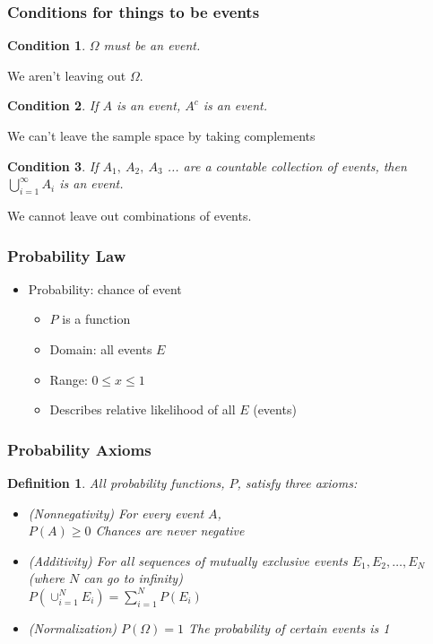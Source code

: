 \documentclass[handout]{beamer}
\newtheorem{condition}{Condition}
\newtheorem{defn}{Definition}
\numberwithin{equation}{section}
\begin{document}
\begin{frame}
\frametitle{Conditions for things to be events}


\begin{condition}
$\Omega$ must be an event. \\
\end{condition}

We aren't leaving out $\Omega$.

\begin{condition}
If $A$ is an event, $A^c$ is an event. \\
\end{condition}

We can't leave the sample space by taking complements

\begin{condition}
If $A_1,\ A_2,\ A_3$ ... are a countable collection of events, then $\bigcup_{i=1}^\infty A_i$ is an event. \\
\end{condition}

We cannot leave out combinations of events.

\end{frame}




\begin{frame}
\frametitle{Probability Law}

\begin{itemize}
\item \alert{Probability}: chance of event \pause 
\begin{itemize}
\item[-] $P$ is a function \pause 
\item[-] Domain: all events $E$ \pause 
\item[-] Range: $0\leq x\leq1$ \pause 
\item[-] Describes relative likelihood of all $E$
  (events)
\end{itemize}
\end{itemize}

\end{frame}

\begin{frame}
\frametitle{Probability Axioms} 


\begin{defn}
All probability functions, $P$, satisfy three axioms: \pause 
\begin{itemize}
\item[1)] (Nonnegativity) For every event $A$, \\ \pause 
$P(A) \geq 0$  \pause 
Chances are never negative \pause 
\item[2)] (Additivity) For all sequences of mutually exclusive events $E_{1},
  E_{2}, \hdots,E_{N} $ (where $N$ can go to infinity)\\\pause 
$P\left(\cup_{i=1}^{N} E_{i}  \right)  =
  \sum_{i=1}^{N} P(E_{i} ) $ 
\item[3)] (Normalization) $P(\Omega) = 1$  \pause 
The probability of certain events is 1 \pause 

\end{itemize}
\end{defn}
\end{frame}
\end{document}
